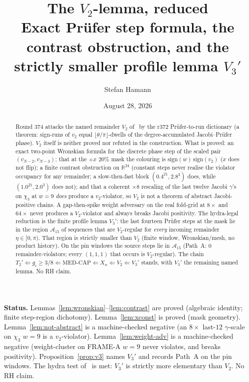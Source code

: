 \documentclass[11pt]{article}
\title{\bfseries The $V_2$-lemma, reduced\\[2mm]
\large Exact Pr\"ufer step formula, the contrast obstruction,
and the strictly smaller profile lemma $V_3'$}
\author{Stefan Hamann}
\date{August 28, 2026}
\theoremstyle{remark}
\newcommand{\R}{\mathbb{R}}
\begin{document}
\maketitle

\begin{abstract}\noindent
Round 374 attacks the named remainder $V_2$ of~\cite{xn,v2}
by the r372 Pr\"ufer-to-run dictionary (a theorem: sign-runs of
$v_2$ equal $\lfloor\theta/\pi\rfloor$-dwells of the
degree-accumulated Jacobi--Pr\"ufer phase).  $V_2$ itself is
neither proved nor refuted in the construction.  What is proved:
an exact two-point Wronskian formula for the discrete phase step
of the scaled pair $(v_{N-2},v_{N-3})$; that at the $+x$
$20\%$ mask the colouring is $\mathrm{sign}(w)\,\mathrm{sign}(v_2)$
($x$ does not flip); a finite contrast obstruction on
$\R^{24}$ (constant steps never realise the violator occupancy
for any remainder; a slow-then-fast block $(0.4^{21},2.8^{3})$
does, while $(1.0^{21},2.0^{3})$ does not);
and that a coherent $\times 8$ rescaling of the last twelve
Jacobi $\gamma$'s on $\chi_3$ at $w=9$ \emph{does} produce a
$v_2$-violator, so $V_2$ is not a theorem of abstract
Jacobi-positive chains.  A gap-then-spike weight adversary on
the real fold-grid at $8\times$ and $64\times$ never produces a
$V_2$-violator and always breaks Jacobi positivity.  The hydra-legal
reduction is the finite profile lemma $V_3'$: the last fourteen
Pr\"ufer steps at the mask lie in the region $\mathcal{A}_{15}$
of sequences that are $V_2$-regular for \emph{every} incoming
remainder $\eta\in[0,\pi)$.  That region is strictly smaller
than $V_2$ (finite window, Wronskian/mesh, no product history).
On the pin windows the source steps lie in $\mathcal{A}_{15}$
(Path~A: $0$ remainder-violators; every $(1,1,1)$ that occurs
is $V_2$-regular).  The chain
$T_2'\Leftarrow g_i\ge 3/8\Leftarrow\mathrm{MED\text{-}CAP}
\Leftarrow X_n\Leftarrow V_2\Leftarrow V_3'$
stands, with $V_3'$ the remaining named lemma.  No RH claim.
\end{abstract}

\medskip\noindent
\textbf{Status.}\enspace
Lemmas~\ref{lem:wronskian}--\ref{lem:contrast} are proved
(algebraic identity; finite step-region dichotomy).
Lemma~\ref{lem:xconst} is proved (mask geometry).
Lemma~\ref{lem:not-abstract} is a machine-checked negative
(an $8\times$ last-$12$ $\gamma$-scale on $\chi_3$ $w=9$ is a
$v_2$-violator).  Lemma~\ref{lem:weight-adv} is a machine-checked
negative (weight-cluster on FRAME-A $w=9$ never violates, and
breaks positivity).  Proposition~\ref{prop:v3} names $V_3'$ and
records Path~A on the pin windows.  The hydra test of~\cite{v2}
is met: $V_3'$ is strictly more elementary than $V_2$.
No RH claim.
\end{document}
